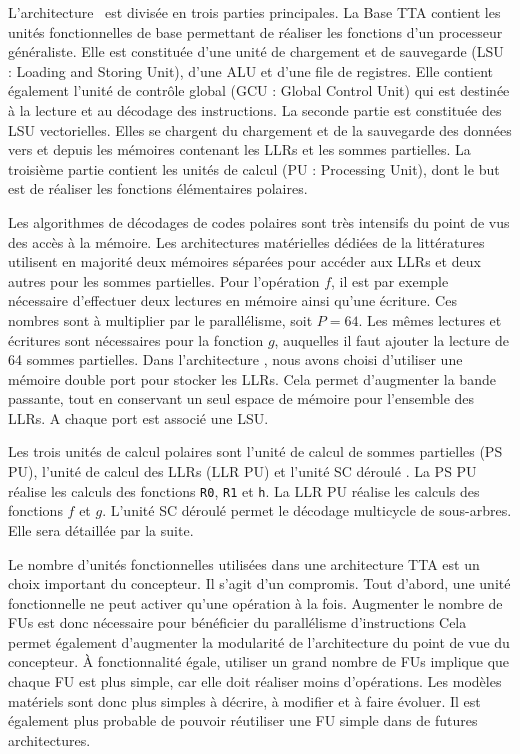 L'architecture \TTSC~est divisée en trois parties principales. La Base TTA contient les unités fonctionnelles de base permettant de réaliser les fonctions d'un processeur généraliste. Elle est constituée d'une unité de chargement et de sauvegarde (LSU : Loading and Storing Unit), d'une ALU et d'une file de registres. Elle contient également l'unité de contrôle global (GCU : Global Control Unit) qui est destinée à la lecture et au décodage des instructions. La seconde partie est constituée des LSU vectorielles. Elles se chargent du chargement et de la sauvegarde des données vers et depuis les mémoires contenant les LLRs et les sommes partielles.
La troisième partie contient les unités de calcul (PU : Processing Unit), dont le but est de réaliser les fonctions élémentaires polaires.

Les algorithmes de décodages de codes polaires sont très intensifs du point de vus des accès à la mémoire. Les architectures matérielles dédiées de la littératures utilisent en majorité deux mémoires séparées pour accéder aux LLRs et deux autres pour les sommes partielles. Pour l'opération $f$, il est par exemple nécessaire d'effectuer deux lectures en mémoire ainsi qu'une écriture. Ces nombres sont à multiplier par le parallélisme, soit $P=64$. Les mêmes lectures et écritures sont nécessaires pour la fonction $g$, auquelles il faut ajouter la lecture de 64 sommes partielles. Dans l'architecture \TTSC, nous avons choisi d'utiliser une mémoire double port pour stocker les LLRs. Cela permet d'augmenter la bande passante, tout en conservant un seul espace de mémoire pour l'ensemble des LLRs. A chaque port est associé une LSU.

Les trois unités de calcul polaires sont l'unité de calcul de sommes partielles (PS PU), l'unité de calcul des LLRs (LLR PU) et l'unité \og SC déroulé \fg. La PS PU réalise les calculs des fonctions \texttt{R0}, \texttt{R1} et \texttt{h}. La LLR PU réalise les calculs des fonctions $f$ et $g$. L'unité \og SC déroulé \fg permet le décodage multicycle de sous-arbres. Elle sera détaillée par la suite. 

Le nombre d'unités fonctionnelles utilisées dans une architecture TTA est un choix important du concepteur.
Il s'agit d'un compromis.
Tout d'abord, une unité fonctionnelle ne peut activer qu'une opération à la fois.
Augmenter le nombre de FUs est donc nécessaire pour bénéficier du parallélisme d'instructions
Cela permet également d'augmenter la modularité de l'architecture du point de vue du concepteur.
\`A fonctionnalité égale, utiliser un grand nombre de FUs implique que chaque FU est plus simple, car elle doit réaliser moins d'opérations. Les modèles matériels sont donc plus simples à décrire, à modifier et à faire évoluer. Il est également plus probable de pouvoir réutiliser une FU simple dans de futures architectures.

